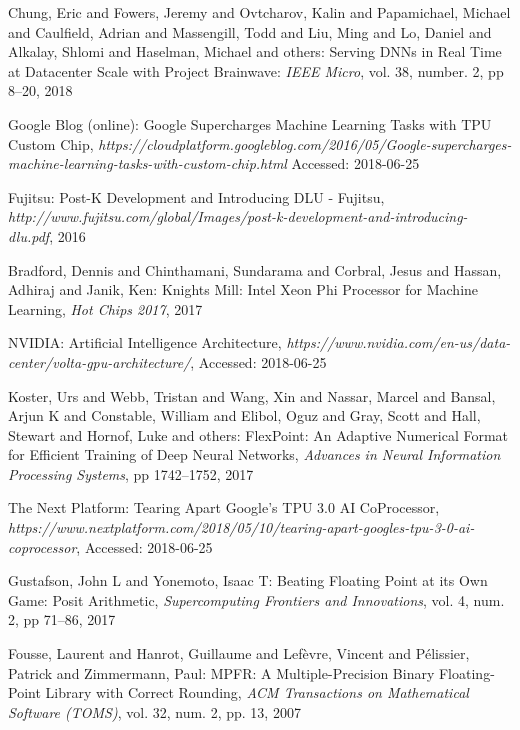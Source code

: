\documentclass[techrep,english]{ipsj} %
\begin{document}
\begin{thebibliography}{99}

  Chung, Eric and Fowers, Jeremy and Ovtcharov, Kalin and Papamichael, Michael and Caulfield, Adrian and Massengill, Todd and Liu, Ming and Lo, Daniel and Alkalay, Shlomi and Haselman, Michael and others:
  Serving DNNs in Real Time at Datacenter Scale with Project Brainwave:
  {\it IEEE Micro},
  vol.
38, number.
2, pp 8--20, 2018

  Google Blog (online):
  Google Supercharges Machine Learning Tasks with TPU Custom Chip,
  {\it https://cloudplatform.googleblog.com/2016/05/Google-supercharges-machine-learning-tasks-with-custom-chip.html}
  Accessed: 2018-06-25

  Fujitsu:
  Post-K Development and Introducing DLU - Fujitsu,
  {\it http://www.fujitsu.com/global/Images/post-k-development-and-introducing-dlu.pdf},
  2016

  Bradford, Dennis and Chinthamani, Sundarama and Corbral, Jesus and Hassan, Adhiraj and Janik, Ken:
  Knights Mill: Intel Xeon Phi Processor for Machine Learning,
  {\it Hot Chips 2017},
  2017
  
  NVIDIA:
  Artificial Intelligence Architecture,
  {\it https://www.nvidia.com/en-us/data-center/volta-gpu-architecture/},
  Accessed: 2018-06-25

  Koster, Urs and Webb, Tristan and Wang, Xin and Nassar, Marcel and Bansal, Arjun K and Constable, William and Elibol, Oguz and Gray, Scott and Hall, Stewart and Hornof, Luke and others:
  FlexPoint: An Adaptive Numerical Format for Efficient Training of Deep Neural Networks,
  {\it Advances in Neural Information Processing Systems},
  pp 1742--1752, 2017

  The Next Platform:
  Tearing Apart Google’s TPU 3.0 AI CoProcessor,
  {\it https://www.nextplatform.com/2018/05/10/tearing-apart-googles-tpu-3-0-ai-coprocessor},
  Accessed: 2018-06-25
    
  Gustafson, John L and Yonemoto, Isaac T:
  Beating Floating Point at its Own Game: Posit Arithmetic,
  {\it Supercomputing Frontiers and Innovations},
  vol.
4, num.
2, pp 71--86, 2017

  Fousse, Laurent and Hanrot, Guillaume and Lef{\`e}vre, Vincent and P{\'e}lissier, Patrick and Zimmermann, Paul:
  MPFR: A Multiple-Precision Binary Floating-Point Library with Correct Rounding,
  {\it ACM Transactions on Mathematical Software (TOMS)},
  vol.
32, num.
2, pp.
13, 2007



\end{thebibliography}
\end{document}
